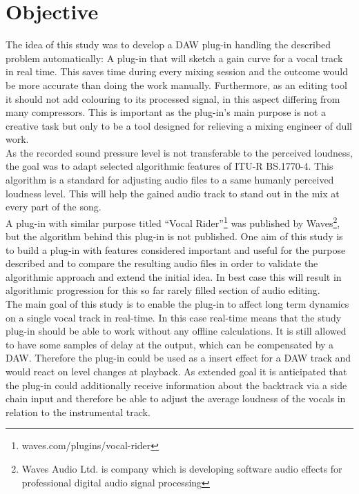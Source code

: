 \section{Objective}

The idea of this study was to develop a DAW plug-in handling the described problem automatically: A plug-in that will sketch a gain curve for a vocal track in real time. This saves time during every mixing session and the outcome would be more accurate than doing the work manually. Furthermore, as an editing tool it should not add colouring to its processed signal, in this aspect differing from many compressors. This is important as the plug-in's main purpose is not a creative task but only to be a tool designed for relieving a mixing engineer of dull work.\\
As the recorded sound pressure level is not transferable to the perceived loudness, the goal was to adapt selected algorithmic features of ITU-R BS.1770-4\cite{ITUalgo}. This algorithm is a standard for adjusting audio files to a same humanly perceived loudness level. This will help the gained audio track to stand out in the mix at every part of the song.\\
A plug-in with similar purpose titled “Vocal Rider”\footnote{waves.com/plugins/vocal-rider} was published by Waves\footnote{Waves Audio Ltd. is company which is developing software audio effects for professional digital audio signal processing}, but the algorithm behind this plug-in is not published. One aim of this study is to build a plug-in with features considered important and useful for the purpose described and to compare the resulting audio files in order to validate the algorithmic approach and extend the initial idea. In best case this will result in algorithmic progression for this so far rarely filled section of audio editing.\\
The main goal of this study is to enable the plug-in to affect long term dynamics on a single vocal track in real-time. In this case real-time means that the study plug-in should be able to work without any offline calculations. It is still allowed to have some samples of delay at the output, which can be compensated by a DAW. Therefore the plug-in could be used as a insert effect for a DAW track and would react on level changes at playback. As extended goal it is anticipated that the plug-in could additionally receive information about the backtrack via a side chain input and therefore be able to adjust the average loudness of the vocals in relation to the instrumental track.\\

